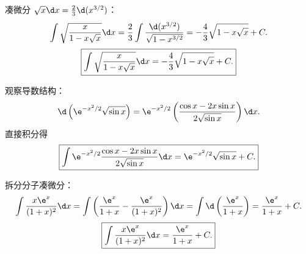 \begin{solution}

    凑微分 $\sqrt{x} \d x = \frac{2}{3}\d(x^{3/2})$：
    \begin{equation}
        \int \sqrt{\frac{x}{1 - x\sqrt{x}}} \d x = \frac{2}{3}\int \frac{\d(x^{3/2})}{\sqrt{1 - x^{3/2}}} = -\frac{4}{3}\sqrt{1 - x\sqrt{x}} + C.
    \end{equation}
    \begin{equation}
        \boxed{\int \sqrt{\frac{x}{1 - x\sqrt{x}}} \d x = -\frac{4}{3}\sqrt{1 - x\sqrt{x}} + C.}
    \end{equation}


    观察导数结构：
    \begin{equation}
        \d\left( \e^{-x^2/2}\sqrt{\sin x} \right) = \e^{-x^2/2}\left( \frac{\cos x - 2x\sin x}{2\sqrt{\sin x}} \right)\d x.
    \end{equation}
    直接积分得
    \begin{equation}
        \boxed{\int \e^{-x^2/2} \frac{\cos x - 2x \sin x}{2\sqrt{\sin x}} \d x = \e^{-x^2/2}\sqrt{\sin x} + C.}
    \end{equation}


    拆分分子凑微分：
    \begin{equation}
        \int \frac{x\e^x}{(1 + x)^2} \d x = \int \left( \frac{\e^x}{1 + x} - \frac{\e^x}{(1 + x)^2} \right) \d x = \int \d\left( \frac{\e^x}{1 + x} \right) = \frac{\e^x}{1 + x} + C.
    \end{equation}
    \begin{equation}
        \boxed{\int \frac{x\e^x}{(1 + x)^2} \d x = \frac{\e^x}{1 + x} + C.}
    \end{equation}
\end{solution}

\endinput
